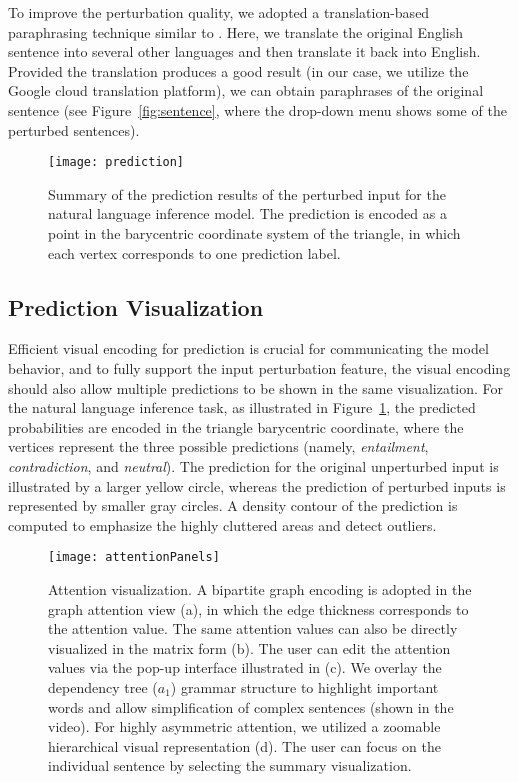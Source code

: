 To improve the perturbation quality, we adopted a translation-based paraphrasing technique similar to \citet{mallinson2017paraphrasing}. Here, we translate the original English sentence into several other languages and then translate it back into English. Provided the translation produces  a good result (in our case, we utilize the Google cloud translation platform), we can obtain paraphrases of the original sentence (see Figure~\ref{fig:sentence}, where the drop-down menu shows some of the perturbed sentences).

\begin{figure}[htbp]
\centering
\vspace{-2mm}
 \texttt{[image: prediction]}
 \caption{
Summary of the prediction results of the perturbed input for the natural language inference model.
The prediction is encoded as a point in the barycentric coordinate system of the triangle, in which each vertex corresponds to one prediction label.
}
\vspace{-3mm}
\label{fig:prediction}
\end{figure}

\subsection{Prediction Visualization}
Efficient visual encoding for prediction is crucial for communicating the model behavior, and to fully support the input perturbation feature, the visual encoding should also allow multiple predictions to be shown in the same visualization.
%
For the natural language inference task, as illustrated in Figure~\ref{fig:prediction}, the predicted probabilities are encoded in the triangle barycentric coordinate, where the vertices represent the three possible predictions (namely, \emph{entailment}, \emph{contradiction}, and \emph{neutral}). The prediction for the original unperturbed input is illustrated by a larger yellow circle, whereas the prediction of perturbed inputs is represented by smaller gray circles.
A density contour of the prediction is computed to emphasize the highly cluttered areas and detect outliers.

\begin{figure*}[t]
\centering
\vspace{-2mm}
 \texttt{[image: attentionPanels]}
  \vspace{-3mm}
 \caption{
Attention visualization. A bipartite graph encoding is adopted in the graph attention view (a), in which the edge thickness corresponds to the attention value. The same attention values can also be directly visualized in the matrix form (b).
The user can edit the attention values via the pop-up interface illustrated in (c).
We overlay the dependency tree ($a_1$) grammar structure to highlight important words and allow simplification of complex sentences (shown in the video).
%
For highly asymmetric attention, we utilized a zoomable hierarchical visual representation (d). The user can focus on the individual sentence by selecting the summary visualization.
}
\vspace{-3mm}
\label{fig:attentionVis}
\end{figure*}

